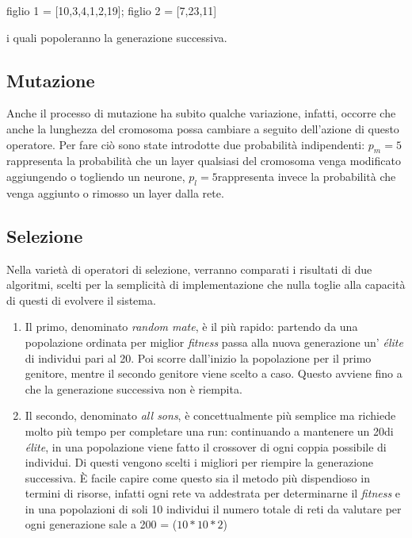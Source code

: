 \documentclass[12pt,a4paper]{report}
\begin{document}
\begin{center}
 figlio 1 = [10,3,4,1,2,19]; figlio 2 = [7,23,11]
\end{center}

i quali popoleranno la generazione successiva.

\subsection{Mutazione}

Anche il processo di mutazione ha subito qualche variazione, infatti, occorre che anche la lunghezza del cromosoma possa cambiare a seguito dell'azione di questo operatore.
Per fare ciò sono state introdotte due probabilità indipendenti: $p_{m} = 5$\textdiscount \text{ }rappresenta la probabilità che un layer qualsiasi del cromosoma venga modificato aggiungendo o togliendo un neurone, $p_{l} = 5$\textdiscount \text{ }rappresenta invece la probabilità che venga aggiunto o rimosso un layer dalla rete.

\subsection{Selezione}

Nella varietà di operatori di selezione, verranno comparati i risultati di due algoritmi, scelti per la semplicità di implementazione che nulla toglie alla capacità di questi di evolvere il sistema.

\begin{enumerate}
 \item Il primo, denominato \textit{random mate}, è il più rapido: partendo da una popolazione ordinata per miglior \textit{fitness} passa alla nuova generazione un' \textit{élite} di individui pari al 20\textdiscount.
 Poi scorre dall'inizio la popolazione per il primo genitore, mentre il secondo genitore viene scelto a caso. 
 Questo avviene fino a che la generazione successiva non è riempita.
 
 \item Il secondo, denominato \textit{all sons}, è concettualmente più semplice ma richiede molto più tempo per completare una run: continuando a mantenere un 20\textdiscount di \textit{élite}, in una popolazione viene fatto il crossover di ogni coppia possibile di individui.
 Di questi vengono scelti i migliori per riempire la generazione successiva.
 È facile capire come questo sia il metodo più dispendioso in termini di risorse, infatti ogni rete va addestrata per determinarne il \textit{fitness} e in una popolazioni di soli 10 individui il numero totale di reti da valutare per ogni generazione sale a 200 =  ($10*10*2$)
 
\end{enumerate}
\end{document}
